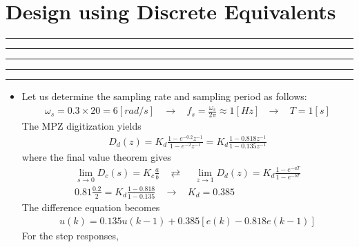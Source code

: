 \setcounter{chapter}{7}
\setcounter{section}{2}
\section{Design using Discrete Equivalents}
\vspace{-8pt} \hrule \hrule \hrule \hrule \hrule  \vspace{12pt}
\begin{itemize}[]
	\item []
	     Let us determine the sampling rate and sampling period as follows:
		\begin{align*}
			\omega_s = 0.3 \times 20 = 6 [rad/s]~~~~\rightarrow~~~~
			f_s = \frac{\omega_s}{2\pi} \approx 1 [Hz]~~~\rightarrow~~~~ T = 1[s]
		\end{align*}
		The MPZ digitization yields 
		\begin{align*}
			D_d(z) = K_d \frac{1-e^{-0.2}z^{-1}}{1-e^{-2}z^{-1}} = K_d  \frac{1-0.818z^{-1}}{1-0.135z^{-1}} 
		\end{align*}
		where the final value theorem gives 
		\begin{align*}
					\lim_{s \rightarrow 0} D_c(s) = K_c \frac{a}{b} ~~~~\rightleftarrows~~~~~ 
			\lim_{z \rightarrow 1} D_d(z) = K_d \frac{1-e^{-aT}}{1-e^{-bT}} \\
						0.81 \frac{0.2}{2}  = K_d \frac{1-0.818}{1-0.135} ~~~~\rightarrow~~~~K_d = 0.385
		\end{align*}
		The difference equation becomes
		\begin{align*}
			u(k) = 0.135u(k-1) + 0.385 [e(k) - 0.818 e(k-1)] 
		\end{align*}
		For the step responses, 

\end{itemize}